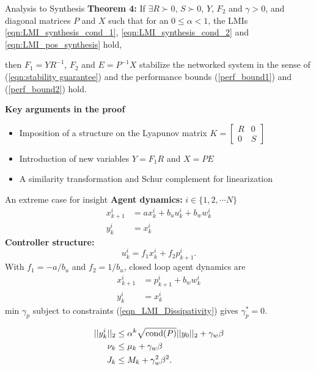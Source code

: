 \begin{frame}{Analysis to Synthesis}
\textbf{Theorem 4:}
	If $\exists R\succ0$, $S\succ0$, $Y$, $F_2$ and $\gamma >0$, and diagonal matrices $P$ and $X$ such that for an $0\leq\alpha<1$, the LMIs \eqref{eqn:LMI_synthesis_cond_1}, \eqref{eqn:LMI_synthesis_cond_2} and \eqref{eqn:LMI_pos_synthesis} hold,
	
	then $F_1=YR^{-1}$, $F_2$ and $E=P^{-1}X$ stabilize the networked system in the sense of (\ref{eqn:stability guarantee}) and the performance bounds (\ref{perf_bound1}) and (\ref{perf_bound2}) hold.
\pause

\textbf{Key arguments in the proof}
\begin{itemize}
	\item Imposition of a structure on the Lyapunov matrix $K=\begin{bmatrix}R&0\\0&S
	\end{bmatrix}$
	\item Introduction of new variables $Y=F_1R$ and $X=PE$
	\item A similarity transformation and Schur complement for linearization 
\end{itemize}
\end{frame}
\begin{frame}{An extreme case for insight}
\textbf{Agent dynamics:} $i \in \{1,2,\cdots N\}$
\begin{equation}
\begin{split}
x^i_{k+1}&=ax^i_k+b_uu^i_k+b_ww^i_k \\
y^i_k&=x^i_k
\end{split}
\end{equation}
\pause
\textbf{Controller structure:}
\begin{equation}
u^i_k=f_1x^i_k+f_2p^i_{k+1}.
\end{equation}
\pause
With $f_1={-a}/{b_u}$ and $f_2={1}/{b_u}$, closed loop agent dynamics are
\begin{equation}
\begin{split}
x^i_{k+1}&=p^i_{k+1}+b_ww^i_k \\
y^i_k&=x^i_k
\end{split}
\end{equation}
\pause
min $\gamma_p$ subject to constraints (\ref{eqn_LMI_Dissipativity}) gives $\gamma_p^*=0$. 

\pause
\begin{align}
\label{eqn:stability guarantee_sp_case_1}
||y_k^i||_2&\leq \alpha^k\sqrt{\textnormal{cond}(P)}||y_0||_2+\gamma_w\beta\\
\label{perf_bound1_sp_case1}
\nu_k&\leq\mu_k+\gamma_w \beta \\
\label{perf_bound2_sp_case1}
J_k&\leq M_k+\gamma_w^2 \beta^2.
\end{align}
\end{frame}
